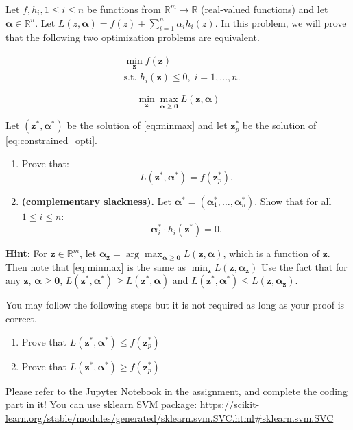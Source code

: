 \documentclass[11pt]{article}
\newenvironment{problem}[2][Problem]{\begin{trivlist}
\item[\hskip \labelsep {\bfseries #1}\hskip \labelsep {\bfseries #2.}]}{\end{trivlist}}
\begin{document}
\begin{problem}{3. (10 points)}
Let $f, h_i, 1\leq i\leq n$ be functions from $\mathbb{R}^m\to\mathbb{R}$ (real-valued functions) and let $\bm{\alpha} \in \mathbb{R}^n$. Let $L(z,\bm{\alpha}) = f(z) + \sum\limits_{i=1}^{n} \alpha_i h_i(z)$. In this problem, we will prove that the following two optimization problems are equivalent.

\begin{minipage}{0.45\textwidth}
\begin{equation}\label{eq:constrained_opti}
\begin{aligned}
& \min_{\bm{z}} f(\bm{z}) \\
& \text{s.t. } h_i(\bm{z}) \leq 0, \; i = 1, \ldots, n.
\end{aligned}
\end{equation} 
\end{minipage}%
\hfill
\begin{minipage}{0.45\textwidth}
\begin{equation}\label{eq:minmax}
\min_{\bm{z}} \max_{\bm{\alpha} \geq \bm{0}} L(\bm{z},\bm{\alpha})
\end{equation}
\end{minipage}

Let $(\bm{z}^*,\bm{\alpha}^*)$ be the solution of \eqref{eq:minmax} and let $\bm{z}_p^*$ be the solution of \eqref{eq:constrained_opti}. 
\begin{enumerate}
\item Prove that:
\[
L(\bm{z}^*, \bm{\alpha}^*)  = f(\bm{z}_p^*).
\]
\item \textbf{(complementary slackness).} Let $\bm{\alpha}^*=(\bm{\alpha}^*_1,\ldots,\bm{\alpha}^*_n)$. Show that for all $1\le i\le n$:
\[
\bm{\alpha}^*_i\cdot h_i(\bm{z}^*)=0.
\]
\end{enumerate}

\textbf{Hint}: For $\bm{z}\in\mathbb{R}^m$, let $\bm{\alpha}_{\bm{z}} = \arg \max_{\bm{\alpha} \geq \bm{0}} L(\bm{z},\bm{\alpha})$, which is a function of $\bm{z}$. Then note that \eqref{eq:minmax} is the same as $\min_{\bm{z}} L(\bm{z}, \bm{\alpha}_{\bm{z}})$ Use the fact that for any $\bm{z}$, 
$\bm{\alpha} \geq \bm{0}$,  $L(\bm{z}^*,\bm{\alpha}^*) \geq L(\bm{z}^*,\bm{\alpha})$ and $L(\bm{z}^*, \bm{\alpha}^*) \leq L(\bm{z},\bm{\alpha}_{\bm{z}})$.

You may follow the following steps but it is not required as long as your proof is correct.
\begin{enumerate}
\item Prove that $L(\bm{z}^*, \bm{\alpha}^*) \leq f(\bm{z}_p^*)$
\item Prove that $L(\bm{z}^*, \bm{\alpha}^*) \geq f(\bm{z}_p^*)$
\end{enumerate}
\end{problem}


\begin{problem}{4 (25 points) SVM Classification}
	Please refer to the Jupyter Notebook in the assignment, and complete the coding part in it!
	You can use sklearn SVM package: \url{https://scikit-learn.org/stable/modules/generated/sklearn.svm.SVC.html#sklearn.svm.SVC}
\end{problem}
\end{document}

